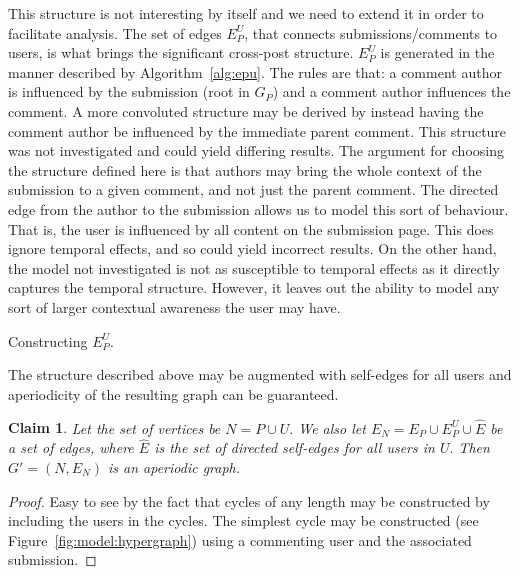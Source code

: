 \documentclass[letterpaper, 10 pt, conference]{ieeeconf}
\theoremstyle{plain}
\newtheorem{claim}{Claim}[section]
\begin{document}
This structure is not interesting by itself and we need to extend it in order to facilitate analysis. The set of edges \(E_P^U\), that connects submissions/comments to users, is what brings the significant cross-post structure. \(E_P^U\) is generated in the manner described by Algorithm~\ref{alg:epu}. The rules are that: a comment author is influenced by the submission (root in \(G_P\)) and a comment author influences the comment. A more convoluted structure may be derived by instead having the comment author be influenced by the immediate parent comment. This structure was not investigated and could yield differing results. The argument for choosing the structure defined here is that authors may bring the whole context of the submission to a given comment, and not just the parent comment. The directed edge from the author to the submission allows us to model this sort of behaviour. That is, the user is influenced by all content on the submission page. This does ignore temporal effects, and so could yield incorrect results. On the other hand, the model not investigated is not as susceptible to temporal effects as it directly captures the temporal structure. However, it leaves out the ability to model any sort of larger contextual awareness the user may have.
\begin{algorithm}
  \caption{Constructing \(E_P^U.\)}
  \label{alg:epu}
\end{algorithm}
The structure described above may be augmented with self-edges for all users and aperiodicity of the resulting graph can be guaranteed.
\begin{claim}
  Let the set of vertices be \(N = P \cup U.\) We also let \(E_N = E_P \cup E_P^U \cup \hat{E}\) be a set of edges, where \(\hat{E}\) is the set of directed self-edges for all users in \(U.\) Then \(G' = (N, E_N)\) is an aperiodic graph.
  \label{claim:g1:aperiodic}
\end{claim}
\begin{proof}
  Easy to see by the fact that cycles of any length may be constructed by including the users in the cycles. The simplest cycle may be constructed (see Figure~\ref{fig:model:hypergraph}) using a commenting user and the associated submission.
\end{proof}
\end{document}
